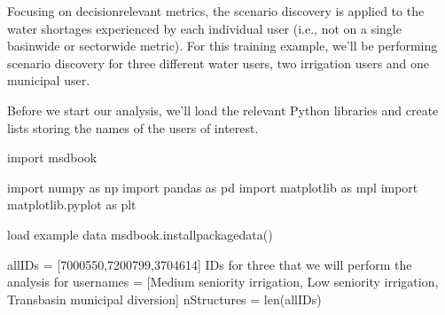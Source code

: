 \documentclass[letterpaper,10pt,english]{book}
\begin{document}
\sphinxAtStartPar
Focusing on decision\sphinxhyphen{}relevant metrics, the scenario discovery is applied
to the water shortages experienced by each individual user (i.e., not on
a single basin\sphinxhyphen{}wide or sector\sphinxhyphen{}wide metric). For this training example,
we’ll be performing scenario discovery for three different water users,
two irrigation users and one municipal user.

\sphinxAtStartPar
Before we start our analysis, we’ll load the relevant Python libraries
and create lists storing the names of the users of interest.

\begin{sphinxVerbatim}[commandchars=\\\{\}]
import msdbook

import numpy as np
import pandas as pd
import matplotlib as mpl
import matplotlib.pyplot as plt

\PYGZsh{} load example data
msdbook.install\PYGZus{}package\PYGZus{}data()

all\PYGZus{}IDs = [\PYGZsq{}7000550\PYGZsq{},\PYGZsq{}7200799\PYGZsq{},\PYGZsq{}3704614\PYGZsq{}] \PYGZsh{} IDs for three that we will perform the analysis for
usernames = [\PYGZsq{}Medium seniority irrigation\PYGZsq{},
             \PYGZsq{}Low seniority irrigation\PYGZsq{},
             \PYGZsq{}Transbasin municipal diversion\PYGZsq{}]
nStructures = len(all\PYGZus{}IDs)
\end{sphinxVerbatim}
\end{document}
